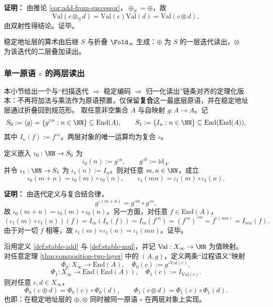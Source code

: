 \textbf{证明：}
由推论 \ref{cor:add-from-successor}，$\oplus_S=\oplus$，故
\[
\mathrm{Val}(c\otimes_S d)=\mathrm{Val}(c)\mathrm{Val}(d)=\mathrm{Val}(c\otimes d),
\]
由双射性得结论。证毕。

\begin{corollary}[极简原语集]\label{cor:primitive-minimal-successor}
稳定地址层的算术由后继 $S$ 与折叠 $\Fold_\infty$ 生成：$\oplus$ 为 $S$ 的一层迭代读出，$\otimes$ 为该迭代的二层叠加读出。
\end{corollary}

\subsubsection{单一原语 \texorpdfstring{$\circ$}{o} 的两层读出}\label{subsec:arith-composition}
本小节给出一个与“扫描迭代 $\Rightarrow$ 稳定编码 $\Rightarrow$ 归一化读出”链条对齐的定理化版本：不再将加法与乘法作为原语预置，仅保留\textbf{复合}这一最底层原语，并在稳定地址层通过折叠回到规范形。
取任意非空集合 $A$ 与自映射 $g:A\to A$。记
\[
S_0:=\langle g\rangle=\{g^{\circ n}:n\in\NN\}\subseteq \mathrm{End}(A),\qquad
S_1:=\{I_n:n\in\NN\}\subseteq \mathrm{End}(\mathrm{End}(A)),
\]
其中 $I_n(f):=f^{\circ n}$。两层对象的唯一运算均为复合 $\circ$。

\begin{theorem}\label{thm:composition-two-layer}
定义嵌入 $\iota_0:\NN\to S_0$ 为
\[
\iota_0(n):=g^{\circ n},\qquad g^{\circ 0}:=\mathrm{id}_A.
\]
并令 $\iota_1:\NN\to S_1$ 为 $\iota_1(n):=I_n$。则对任意 $m,n\in\NN$，成立
\[
\iota_0(m+n)=\iota_0(m)\circ \iota_0(n),
\qquad
\iota_1(mn)=\iota_1(m)\circ \iota_1(n).
\]
\end{theorem}

\textbf{证明：}
由迭代定义与复合结合律，
\[
g^{\circ(m+n)}=g^{\circ m}\circ g^{\circ n},
\]
故 $\iota_0(m+n)=\iota_0(m)\circ \iota_0(n)$。另一方面，对任意 $f\in\mathrm{End}(A)$，
\[
(\iota_1(m)\circ \iota_1(n))(f)=I_m(I_n(f))=I_m(f^{\circ n})=(f^{\circ n})^{\circ m}
=f^{\circ (nm)}=I_{mn}(f).
\]
由于对一切 $f$ 相等，故 $\iota_1(m)\circ \iota_1(n)=\iota_1(mn)$。证毕。

\begin{theorem}\label{thm:arith-composition}
沿用定义 \ref{def:stable-add} 与 \ref{def:stable-mul}，并记 $\mathrm{Val}:X_\infty\to\NN$ 为值映射。对任意定理 \ref{thm:composition-two-layer} 中的 $(A,g)$，定义两条“过程语义”映射
\[
\Phi_0:X_\infty\to \mathrm{End}(A),\quad \Phi_0(c):=g^{\circ\mathrm{Val}(c)},
\]
\[
\Phi_1:X_\infty\to \mathrm{End}(\mathrm{End}(A)),\quad \Phi_1(c):=I_{\mathrm{Val}(c)}.
\]
则对任意 $c,d\in X_\infty$，
\[
\Phi_0(c\oplus d)=\Phi_0(c)\circ\Phi_0(d),\qquad
\Phi_1(c\otimes d)=\Phi_1(c)\circ\Phi_1(d).
\]
也即：在稳定地址层的 $\oplus,\otimes$ 同时被同一原语 $\circ$ 在两层对象上实现。
\end{theorem}

